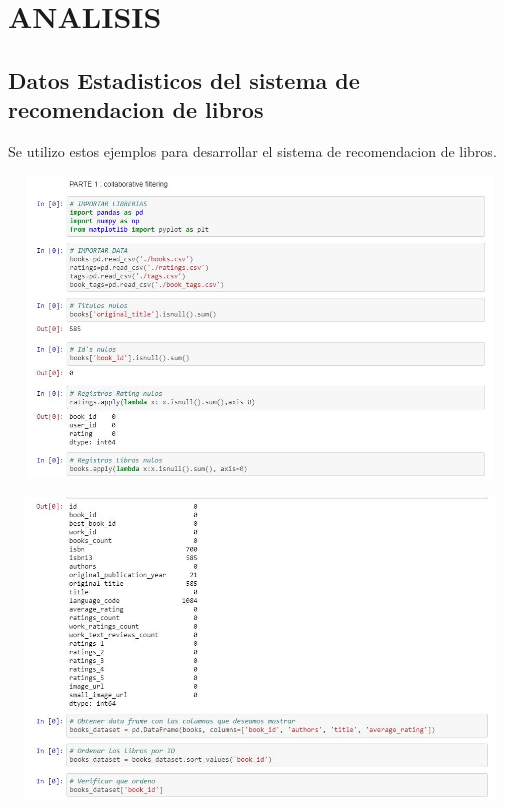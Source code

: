 \section{ANALISIS} 
\subsection{Datos Estadisticos del sistema de recomendacion de libros}
	
Se utilizo estos ejemplos para desarrollar el sistema de recomendacion de libros.


\begin{center}
\includegraphics[width=18cm, height=8cm]{./Imagenes/traba1.jpg}
\end{center}


\begin{center}
\includegraphics[width=18cm, height=8cm]{./Imagenes/traba2.jpg}
\end{center}


